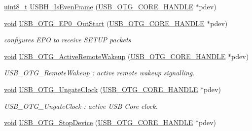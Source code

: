 \begin{DoxyCompactItemize}
\hyperlink{stdint_8h_aba7bc1797add20fe3efdf37ced1182c5}{uint8\-\_\-t} \hyperlink{group___u_s_b___c_o_r_e___exported___functions_prototype_ga5de090d9b0a5998887bdddb0a55b452b}{U\-S\-B\-H\-\_\-\-Is\-Even\-Frame} (\hyperlink{group___u_s_b___c_o_r_e___exported___types_gaf76054c11eb8a3367907aad7ae700e80}{U\-S\-B\-\_\-\-O\-T\-G\-\_\-\-C\-O\-R\-E\-\_\-\-H\-A\-N\-D\-L\-E} $\ast$pdev)
\item 
\hyperlink{group___n_a_m_e_ga18028b8badbf1ea7e704ccac3c488e82}{void} \hyperlink{group___u_s_b___c_o_r_e___exported___functions_prototype_gac6e350367b0ba6e54a333cb9bc964bfa}{U\-S\-B\-\_\-\-O\-T\-G\-\_\-\-E\-P0\-\_\-\-Out\-Start} (\hyperlink{group___u_s_b___c_o_r_e___exported___types_gaf76054c11eb8a3367907aad7ae700e80}{U\-S\-B\-\_\-\-O\-T\-G\-\_\-\-C\-O\-R\-E\-\_\-\-H\-A\-N\-D\-L\-E} $\ast$pdev)
\begin{DoxyCompactList}\small\item\em configures E\-P\-O to receive S\-E\-T\-U\-P packets \end{DoxyCompactList}\item 
\hyperlink{group___n_a_m_e_ga18028b8badbf1ea7e704ccac3c488e82}{void} \hyperlink{group___u_s_b___c_o_r_e___exported___functions_prototype_ga0b146580d6afa89a08f5528a1823a362}{U\-S\-B\-\_\-\-O\-T\-G\-\_\-\-Active\-Remote\-Wakeup} (\hyperlink{group___u_s_b___c_o_r_e___exported___types_gaf76054c11eb8a3367907aad7ae700e80}{U\-S\-B\-\_\-\-O\-T\-G\-\_\-\-C\-O\-R\-E\-\_\-\-H\-A\-N\-D\-L\-E} $\ast$pdev)
\begin{DoxyCompactList}\small\item\em U\-S\-B\-\_\-\-O\-T\-G\-\_\-\-Remote\-Wakeup \-: active remote wakeup signalling. \end{DoxyCompactList}\item 
\hyperlink{group___n_a_m_e_ga18028b8badbf1ea7e704ccac3c488e82}{void} \hyperlink{group___u_s_b___c_o_r_e___exported___functions_prototype_ga09056347232b2ad98f4b7ff9eb10d2f6}{U\-S\-B\-\_\-\-O\-T\-G\-\_\-\-Ungate\-Clock} (\hyperlink{group___u_s_b___c_o_r_e___exported___types_gaf76054c11eb8a3367907aad7ae700e80}{U\-S\-B\-\_\-\-O\-T\-G\-\_\-\-C\-O\-R\-E\-\_\-\-H\-A\-N\-D\-L\-E} $\ast$pdev)
\begin{DoxyCompactList}\small\item\em U\-S\-B\-\_\-\-O\-T\-G\-\_\-\-Ungate\-Clock \-: active U\-S\-B Core clock. \end{DoxyCompactList}\item 
\hyperlink{group___n_a_m_e_ga18028b8badbf1ea7e704ccac3c488e82}{void} \hyperlink{group___u_s_b___c_o_r_e___exported___functions_prototype_ga4d577352c51b0c2620987c1b470000ba}{U\-S\-B\-\_\-\-O\-T\-G\-\_\-\-Stop\-Device} (\hyperlink{group___u_s_b___c_o_r_e___exported___types_gaf76054c11eb8a3367907aad7ae700e80}{U\-S\-B\-\_\-\-O\-T\-G\-\_\-\-C\-O\-R\-E\-\_\-\-H\-A\-N\-D\-L\-E} $\ast$pdev)

\end{DoxyCompactItemize}
